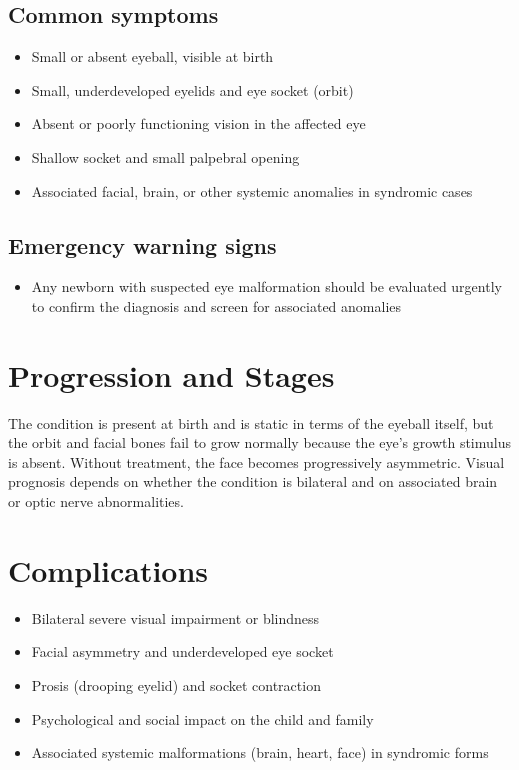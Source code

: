 \subsection{Common symptoms}
\begin{itemize}[noitemsep]
  \item Small or absent eyeball, visible at birth
  \item Small, underdeveloped eyelids and eye socket (orbit)
  \item Absent or poorly functioning vision in the affected eye
  \item Shallow socket and small palpebral opening
  \item Associated facial, brain, or other systemic anomalies in syndromic cases
\end{itemize}
\subsection{Emergency warning signs}
\begin{itemize}[noitemsep]
  \item Any newborn with suspected eye malformation should be evaluated urgently to confirm the diagnosis and screen for associated anomalies
\end{itemize}
\section{Progression and Stages}
The condition is present at birth and is static in terms of the eyeball itself, but the orbit and facial bones fail to grow normally because the eye's growth stimulus is absent. Without treatment, the face becomes progressively asymmetric. Visual prognosis depends on whether the condition is bilateral and on associated brain or optic nerve abnormalities.
\section{Complications}
\begin{itemize}[noitemsep]
  \item Bilateral severe visual impairment or blindness
  \item Facial asymmetry and underdeveloped eye socket
  \item Prosis (drooping eyelid) and socket contraction
  \item Psychological and social impact on the child and family
  \item Associated systemic malformations (brain, heart, face) in syndromic forms
\end{itemize}
